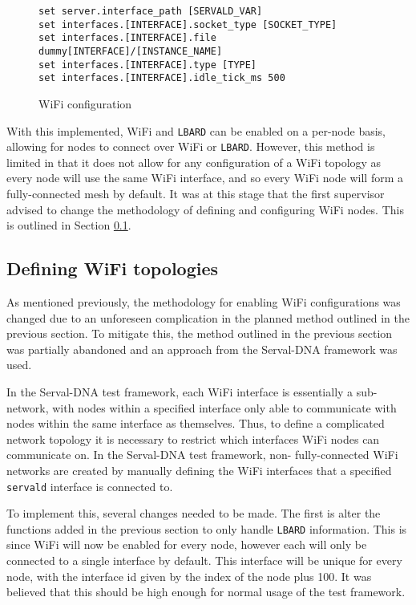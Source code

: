 \begin{figure}
    \begin{centering}
\begin{lstlisting}[basicstyle=\small, breaklines, frame=single]
set server.interface_path [SERVALD_VAR]
set interfaces.[INTERFACE].socket_type [SOCKET_TYPE]
set interfaces.[INTERFACE].file dummy[INTERFACE]/[INSTANCE_NAME]
set interfaces.[INTERFACE].type [TYPE]
set interfaces.[INTERFACE].idle_tick_ms 500
\end{lstlisting}
        \caption{WiFi configuration}
        \label{fig:chapter4WifiConfig}
    \end{centering}
\end{figure}

With this implemented, WiFi and \texttt{LBARD} can be enabled on a per-node basis, allowing for nodes to connect over WiFi or \texttt{LBARD}.
However, this method is limited in that it does not allow for any configuration of a WiFi topology as every node will use the same WiFi interface, and so every WiFi node will form a fully-connected mesh by default.
It was at this stage that the first supervisor advised to change the methodology of defining and configuring WiFi nodes.
This is outlined in Section \ref{subsection:DefiningWiFi}.


\subsection{Defining WiFi topologies}
\label{subsection:DefiningWiFi}
As mentioned previously, the methodology for enabling WiFi configurations was changed due to an unforeseen complication in the planned method outlined in the previous section.
To mitigate this, the method outlined in the previous section was partially abandoned and an approach from the Serval-DNA framework was used.

In the Serval-DNA test framework, each WiFi interface is essentially a sub-network, with nodes within a specified interface only able to communicate with nodes within the same interface as themselves.
Thus, to define a complicated network topology it is necessary to restrict which interfaces WiFi nodes can communicate on.
In the Serval-DNA test framework, non- fully-connected WiFi networks are created by manually defining the WiFi interfaces that a specified \texttt{servald} interface is connected to.


To implement this, several changes needed to be made.
The first is alter the functions added in the previous section to only handle \texttt{LBARD} information.
This is since WiFi will now be enabled for every node, however each will only be connected to a single interface by default.
This interface will be unique for every node, with the interface id given by the index of the node plus 100.
It was believed that this should be high enough for normal usage of the test framework.

